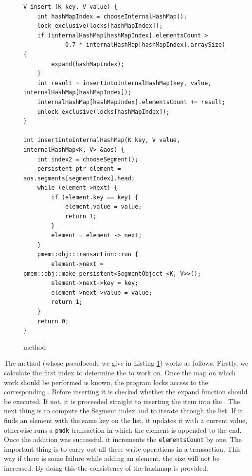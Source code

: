 \begin{figure}[ht]
\renewcommand{\figurename}{Listing}
\begin{lstlisting}
V insert (K key, V value) {
    int hashMapIndex = chooseInternalHashMap();
    lock_exclusive(locks[hashMapIndex]);
    if (internalHashMap[hashMapIndex].elementsCount > 
            0.7 * internalHashMap[hashMapIndex].arraySize) {
        expand(hashMapIndex);
    }
    int result = insertIntoInternalHashMap(key, value, internalHashMap[hashMapIndex]);
    internalHashMap[hashMapIndex].elementsCount += result;
    unlock_exclusive(locks[hashMapIndex]);
}
    
int insertIntoInternalHashMap(K key, V value, internalHashMap<K, V> &aos) {
    int index2 = chooseSegment();
    persistent_ptr element = aos.segments[segmentIndex].head;
    while (element->next) {
        if (element.key == key) {
            element.value = value;
            return 1;
        } 
        element = element -> next;
    }
    pmem::obj::transaction::run {
        element->next = pmem::obj::make_persistent<SegmentObject <K, V>>();
        element->next->key = key;
        element->next->value = value;
        return 1;
    }
    return 0;
}
\end{lstlisting}
\renewcommand{\figurename}{Listing}
\caption{\insertMethod method}
\label{insertMethod}
\end{figure}
        The \insertMethod method (whose pseudocode we give in Listing \ref{insertMethod}) works as follows.
        Firstly, we calculate the first index to determine the \internalHashMap to work on.  
        Once the map on which work should be performed is known, the program locks access to the corresponding \internalHashMap. 
        Before inserting it is checked whether the expand function should be executed. 
        If not, it is proceeded straight to inserting the item into the \internalHashMap. 
        The next thing is to compute the Segment index and to iterate through the list. 
        If it finds an element with the same key on the list, it updates it with a current value, otherwise runs a \texttt{pmdk} transaction in which the element is appended to the end.
        Once the addition was successful, it increments the \texttt{elementsCount} by one. 
        The important thing is to carry out all these write operations in a transaction. 
        This way if there is some failure while adding an element, the size will not be increased. 
        By doing this the consistency of the hashmap is provided.
        
